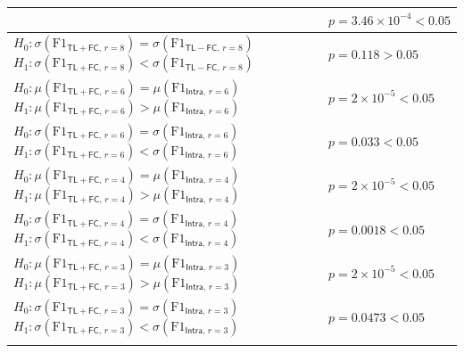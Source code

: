 \begin{table}[t]
\begin{tabularx}{\linewidth}{|X|l|}
  & $p = 3.46 \times 10^{-4} < 0.05$ \\
  \hline
  \( H_0: \sigma\left(\text{F1}_{\mathsf{TL{+}FC},\, r=8}\right) = \sigma\left(\text{F1}_{\mathsf{TL{-}FC},\, r=8}\right) \) \newline
  \( H_1: \sigma\left(\text{F1}_{\mathsf{TL{+}FC},\, r=8}\right) < \sigma\left(\text{F1}_{\mathsf{TL{-}FC},\, r=8}\right) \)
  &  $p = 0.118 > 0.05$ \\
  \Xhline{1.8\arrayrulewidth}
  \( H_0: \mu\left(\text{F1}_{\mathsf{TL{+}FC},\, r=6}\right) = \mu\left(\text{F1}_{\mathsf{Intra},\, r=6}\right) \) \newline
  \( H_1: \mu\left(\text{F1}_{\mathsf{TL{+}FC},\, r=6}\right) > \mu\left(\text{F1}_{\mathsf{Intra},\, r=6}\right) \)
  & $p = 2 \times 10^{-5} < 0.05$ \\
  \hline
  \( H_0: \sigma\left(\text{F1}_{\mathsf{TL{+}FC},\, r=6}\right) = \sigma\left(\text{F1}_{\mathsf{Intra},\, r=6}\right) \) \newline
  \( H_1: \sigma\left(\text{F1}_{\mathsf{TL{+}FC},\, r=6}\right) < \sigma\left(\text{F1}_{\mathsf{Intra},\, r=6}\right) \)
  & $p = 0.033 < 0.05$ \\
  \Xhline{1.8\arrayrulewidth}
  \( H_0: \mu\left(\text{F1}_{\mathsf{TL{+}FC},\, r=4}\right) = \mu\left(\text{F1}_{\mathsf{Intra},\, r=4}\right) \) \newline
  \( H_1: \mu\left(\text{F1}_{\mathsf{TL{+}FC},\, r=4}\right) > \mu\left(\text{F1}_{\mathsf{Intra},\, r=4}\right) \)
  & $p = 2 \times 10^{-5} < 0.05$ \\
  \hline
  \( H_0: \sigma\left(\text{F1}_{\mathsf{TL{+}FC},\, r=4}\right) = \sigma\left(\text{F1}_{\mathsf{Intra},\, r=4}\right) \) \newline
  \( H_1: \sigma\left(\text{F1}_{\mathsf{TL{+}FC},\, r=4}\right) < \sigma\left(\text{F1}_{\mathsf{Intra},\, r=4}\right) \)
  & $p = 0.0018 < 0.05$ \\
  \Xhline{1.8\arrayrulewidth}
  \( H_0: \mu\left(\text{F1}_{\mathsf{TL{+}FC},\, r=3}\right) = \mu\left(\text{F1}_{\mathsf{Intra},\, r=3}\right) \) \newline
  \( H_1: \mu\left(\text{F1}_{\mathsf{TL{+}FC},\, r=3}\right) > \mu\left(\text{F1}_{\mathsf{Intra},\, r=3}\right) \)
  & $p = 2 \times 10^{-5} < 0.05$ \\
  \hline
  \( H_0: \sigma\left(\text{F1}_{\mathsf{TL{+}FC},\, r=3}\right) = \sigma\left(\text{F1}_{\mathsf{Intra},\, r=3}\right) \) \newline
  \( H_1: \sigma\left(\text{F1}_{\mathsf{TL{+}FC},\, r=3}\right) < \sigma\left(\text{F1}_{\mathsf{Intra},\, r=3}\right) \)
  & $p = 0.0473 < 0.05$ \\
  \Xhline{2\arrayrulewidth}
\end{tabularx}
\label{table:statistical-tests}
\end{table}

